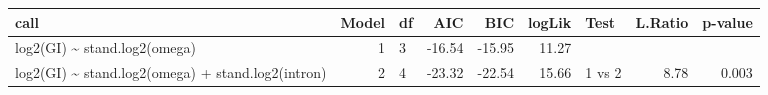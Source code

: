 \begin{table}[ht]
\centering
\begin{tabular}{lrlrrrlrr}
  \hline
call & Model & df & AIC & BIC & logLik & Test & L.Ratio & p-value \\ 
  \hline
log2(GI) \~{} stand.log2(omega) &  1 & 3 & -16.54 & -15.95 & 11.27 &  &  &  \\ 
  log2(GI) \~{} stand.log2(omega) + stand.log2(intron) &  2 & 4 & -23.32 & -22.54 & 15.66 & 1 vs 2 & 8.78 & 0.003 \\ 
   \hline
\end{tabular}
\end{table}

